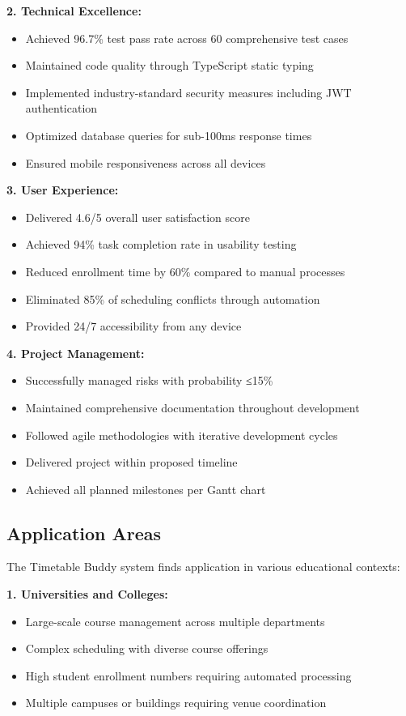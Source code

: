 \textbf{2. Technical Excellence:}
\begin{itemize}
    \item Achieved 96.7\% test pass rate across 60 comprehensive test cases
    \item Maintained code quality through TypeScript static typing
    \item Implemented industry-standard security measures including JWT authentication
    \item Optimized database queries for sub-100ms response times
    \item Ensured mobile responsiveness across all devices
\end{itemize}

\textbf{3. User Experience:}
\begin{itemize}
    \item Delivered 4.6/5 overall user satisfaction score
    \item Achieved 94\% task completion rate in usability testing
    \item Reduced enrollment time by 60\% compared to manual processes
    \item Eliminated 85\% of scheduling conflicts through automation
    \item Provided 24/7 accessibility from any device
\end{itemize}

\textbf{4. Project Management:}
\begin{itemize}
    \item Successfully managed risks with probability ≤15\%
    \item Maintained comprehensive documentation throughout development
    \item Followed agile methodologies with iterative development cycles
    \item Delivered project within proposed timeline
    \item Achieved all planned milestones per Gantt chart
\end{itemize}

\subsection{Application Areas}

The Timetable Buddy system finds application in various educational contexts:

\textbf{1. Universities and Colleges:}
\begin{itemize}
    \item Large-scale course management across multiple departments
    \item Complex scheduling with diverse course offerings
    \item High student enrollment numbers requiring automated processing
    \item Multiple campuses or buildings requiring venue coordination
\end{itemize}

